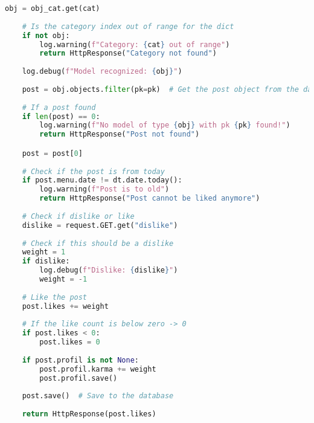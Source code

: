 \begin{lstlisting}[language=Python]
    obj = obj_cat.get(cat)
    
    # Is the category index out of range for the dict
    if not obj:
        log.warning(f"Category: {cat} out of range")
        return HttpResponse("Category not found")
    
    log.debug(f"Model recognized: {obj}")
    
    post = obj.objects.filter(pk=pk)  # Get the post object from the database
    
    # If a post found
    if len(post) == 0:
        log.warning(f"No model of type {obj} with pk {pk} found!")
        return HttpResponse("Post not found")

    post = post[0]
    
    # Check if the post is from today
    if post.menu.date != dt.date.today():
        log.warning(f"Post is to old")
        return HttpResponse("Post cannot be liked anymore")
    
    # Check if dislike or like
    dislike = request.GET.get("dislike")
    
    # Check if this should be a dislike
    weight = 1
    if dislike:
        log.debug(f"Dislike: {dislike}")
        weight = -1
    
    # Like the post
    post.likes += weight
    
    # If the like count is below zero -> 0
    if post.likes < 0:
        post.likes = 0
        
    if post.profil is not None:
        post.profil.karma += weight
        post.profil.save()
    
    post.save()  # Save to the database
    
    return HttpResponse(post.likes)

\end{lstlisting}
